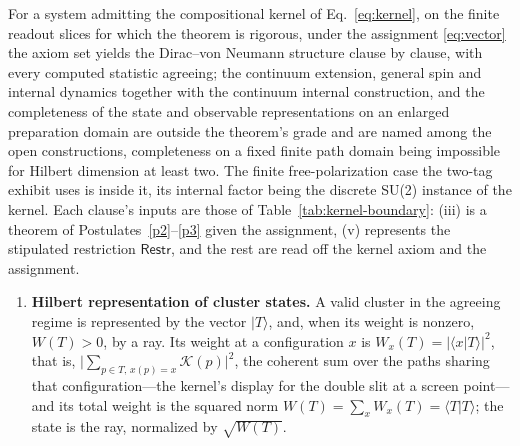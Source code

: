 \begin{theorem}\label{thm:recovery} For a system admitting the compositional kernel of Eq.~\eqref{eq:kernel}, on the finite readout slices for which the theorem is rigorous, under the assignment \eqref{eq:vector} the axiom set yields the Dirac--von Neumann structure clause by clause, with every computed statistic agreeing; the continuum extension, general spin and internal dynamics together with the continuum internal construction, and the completeness of the state and observable representations on an enlarged preparation domain are outside the theorem's grade and are named among the open constructions, completeness on a fixed finite path domain being impossible for Hilbert dimension at least two. The finite free-polarization case the two-tag exhibit uses is inside it, its internal factor being the discrete SU(2) instance of the kernel. Each clause's inputs are those of Table~\ref{tab:kernel-boundary}: (iii) is a theorem of Postulates~\ref{p2}--\ref{p3} given the assignment, (v) represents the stipulated restriction $\mathsf{Restr}$, and the rest are read off the kernel axiom and the assignment.
\begin{enumerate}
\item[(i)] \textbf{Hilbert representation of cluster states.} A valid cluster in the agreeing regime is represented by the vector $|T\rangle$, and, when its weight is nonzero, $W(T) > 0$, by a ray. Its weight at a configuration $x$ is $W_x(T) = |\langle x|T\rangle|^2$, that is, $\bigl|\sum_{p \in T,\, x(p)=x}\mathcal{K}(p)\bigr|^2$, the coherent sum over the paths sharing that configuration---the kernel's display for the double slit at a screen point---and its total weight is the squared norm $W(T) = \sum_x W_x(T) = \langle T|T\rangle$; the state is the ray, normalized by $\sqrt{W(T)}$.

\end{enumerate}
\end{theorem}
